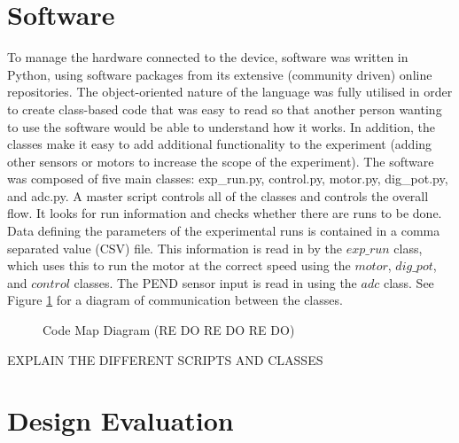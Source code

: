 \documentclass[twoside,a4]{report}
\begin{document}
	\section{Software} %
	To manage the hardware connected to the device, software was written in Python, using software packages from its extensive (community driven) online repositories. The object-oriented nature of the language was fully utilised in order to create class-based code that was easy to read so that another person wanting to use the software would be able to understand how it works. In addition, the classes make it easy to add additional functionality to the experiment (adding other sensors or motors to increase the scope of the experiment). The software was composed of five main classes: exp\_run.py, control.py, motor.py, dig\_pot.py, and adc.py. \newline \newline \noindent
	A master script controls all of the classes and controls the overall flow. It looks for run information and checks whether there are runs to be done. Data defining the parameters of the experimental runs is contained in a comma separated value (CSV) file. This information is read in by the \(exp\_run\) class, which uses this to run the motor at the correct speed using the \(motor\), \(dig\_pot\), and \(control\) classes. The PEND sensor input is read in using the \(adc\) class. See Figure \ref{codemap} for a diagram of communication between the classes. \newline 
	\begin{figure}[!htb]
		\centering
		\caption{Code Map Diagram (RE DO RE DO RE DO)}
		\label{codemap}
	\end{figure}
	EXPLAIN THE DIFFERENT SCRIPTS AND CLASSES



	\section{Design Evaluation}
	
\end{document}
